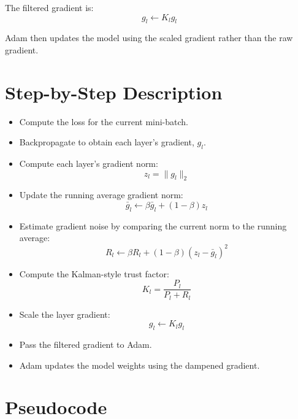 \documentclass{article}
\begin{document}
The filtered gradient is:
\[
g_l \leftarrow K_l g_l
\]

Adam then updates the model using the scaled gradient rather than the raw gradient.

\section{Step-by-Step Description}

\begin{itemize}
    \item Compute the loss for the current mini-batch.

    \item Backpropagate to obtain each layer's gradient, $g_l$.

    \item Compute each layer's gradient norm:
    \[
        z_l = \|g_l\|_2
    \]

    \item Update the running average gradient norm:
    \[
        \bar{g}_l \leftarrow \beta \bar{g}_l + (1-\beta)z_l
    \]

    \item Estimate gradient noise by comparing the current norm to the running average:
    \[
        R_l \leftarrow \beta R_l + (1-\beta)(z_l-\bar{g}_l)^2
    \]

    \item Compute the Kalman-style trust factor:
    \[
        K_l = \frac{P_l}{P_l + R_l}
    \]

    \item Scale the layer gradient:
    \[
        g_l \leftarrow K_l g_l
    \]

    \item Pass the filtered gradient to Adam.

    \item Adam updates the model weights using the dampened gradient.
\end{itemize}

\section{Pseudocode}
\end{document}
